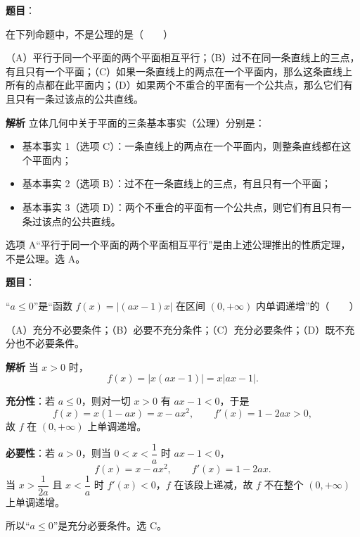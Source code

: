 \begin{answer}

\textbf{题目}：

在下列命题中，不是公理的是\mbox{（　　）}

（A）平行于同一个平面的两个平面相互平行；（B）过不在同一条直线上的三点，有且只有一个平面；（C）如果一条直线上的两点在一个平面内，那么这条直线上所有的点都在此平面内；（D）如果两个不重合的平面有一个公共点，那么它们有且只有一条过该点的公共直线。

\textbf{解析}
立体几何中关于平面的三条基本事实（公理）分别是：

\begin{itemize}
\item 基本事实 1（选项 C）：一条直线上的两点在一个平面内，则整条直线都在这个平面内；
\item 基本事实 2（选项 B）：过不在一条直线上的三点，有且只有一个平面；
\item 基本事实 3（选项 D）：两个不重合的平面有一个公共点，则它们有且只有一条过该点的公共直线。
\end{itemize}

选项 A“平行于同一个平面的两个平面相互平行”是由上述公理推出的性质定理，不是公理。选 A。


\end{answer}
\begin{answer}

\textbf{题目}：

“$a\leqslant0$”是“函数 $f(x)=|(ax-1)x|$ 在区间 $(0,+\infty)$ 内单调递增”的\mbox{（　　）}

（A）充分不必要条件；（B）必要不充分条件；（C）充分必要条件；（D）既不充分也不必要条件。

\textbf{解析}
当 $x>0$ 时，
\nopagebreak[4]
\[f(x)=|x(ax-1)|=x|ax-1|.\]

\textbf{充分性}：若 $a\leqslant0$，则对一切 $x>0$ 有 $ax-1<0$，于是
\nopagebreak[4]
\[f(x)=x(1-ax)=x-ax^2,\qquad f'(x)=1-2ax>0,\]
故 $f$ 在 $(0,+\infty)$ 上单调递增。

\textbf{必要性}：若 $a>0$，则当 $0<x<\dfrac1a$ 时 $ax-1<0$，
\nopagebreak[4]
\[f(x)=x-ax^2,\qquad f'(x)=1-2ax.\]
当 $x>\dfrac1{2a}$ 且 $x<\dfrac1a$ 时 $f'(x)<0$，$f$ 在该段上递减，故 $f$ 不在整个 $(0,+\infty)$ 上单调递增。

所以“$a\leqslant0$”是充分必要条件。选 C。


\end{answer}
